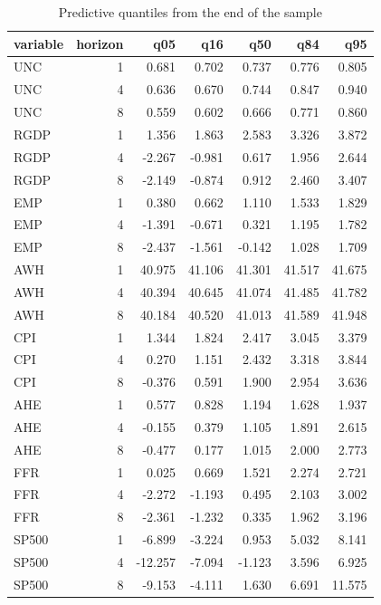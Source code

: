 \begin{table}[htbp]
\centering
\caption{Predictive quantiles from the end of the sample}
\label{tab:fc}
\begin{tabular}{lrrrrrr}
\toprule
variable & horizon & q05 & q16 & q50 & q84 & q95 \\
\midrule
UNC & 1 & 0.681 & 0.702 & 0.737 & 0.776 & 0.805 \\
UNC & 4 & 0.636 & 0.670 & 0.744 & 0.847 & 0.940 \\
UNC & 8 & 0.559 & 0.602 & 0.666 & 0.771 & 0.860 \\
RGDP & 1 & 1.356 & 1.863 & 2.583 & 3.326 & 3.872 \\
RGDP & 4 & -2.267 & -0.981 & 0.617 & 1.956 & 2.644 \\
RGDP & 8 & -2.149 & -0.874 & 0.912 & 2.460 & 3.407 \\
EMP & 1 & 0.380 & 0.662 & 1.110 & 1.533 & 1.829 \\
EMP & 4 & -1.391 & -0.671 & 0.321 & 1.195 & 1.782 \\
EMP & 8 & -2.437 & -1.561 & -0.142 & 1.028 & 1.709 \\
AWH & 1 & 40.975 & 41.106 & 41.301 & 41.517 & 41.675 \\
AWH & 4 & 40.394 & 40.645 & 41.074 & 41.485 & 41.782 \\
AWH & 8 & 40.184 & 40.520 & 41.013 & 41.589 & 41.948 \\
CPI & 1 & 1.344 & 1.824 & 2.417 & 3.045 & 3.379 \\
CPI & 4 & 0.270 & 1.151 & 2.432 & 3.318 & 3.844 \\
CPI & 8 & -0.376 & 0.591 & 1.900 & 2.954 & 3.636 \\
AHE & 1 & 0.577 & 0.828 & 1.194 & 1.628 & 1.937 \\
AHE & 4 & -0.155 & 0.379 & 1.105 & 1.891 & 2.615 \\
AHE & 8 & -0.477 & 0.177 & 1.015 & 2.000 & 2.773 \\
FFR & 1 & 0.025 & 0.669 & 1.521 & 2.274 & 2.721 \\
FFR & 4 & -2.272 & -1.193 & 0.495 & 2.103 & 3.002 \\
FFR & 8 & -2.361 & -1.232 & 0.335 & 1.962 & 3.196 \\
SP500 & 1 & -6.899 & -3.224 & 0.953 & 5.032 & 8.141 \\
SP500 & 4 & -12.257 & -7.094 & -1.123 & 3.596 & 6.925 \\
SP500 & 8 & -9.153 & -4.111 & 1.630 & 6.691 & 11.575 \\
\bottomrule
\end{tabular}
\end{table}